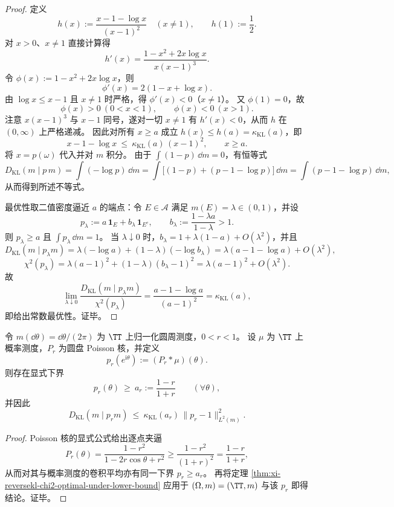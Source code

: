 \begin{proof}
定义
\[
h(x):=\frac{x-1-\log x}{(x-1)^2}\quad(x\neq 1),\qquad h(1):=\frac12.
\]
对 \(x>0\)、\(x\neq 1\) 直接计算得
\[
h'(x)=\frac{1-x^2+2x\log x}{x(x-1)^3}.
\]
令 \(\phi(x):=1-x^2+2x\log x\)，则
\[
\phi'(x)=2(1-x+\log x).
\]
由 \(\log x\le x-1\) 且 \(x\neq 1\) 时严格，得 \(\phi'(x)<0\)（\(x\neq 1\)）。
又 \(\phi(1)=0\)，故
\[
\phi(x)>0\ (0<x<1),\qquad \phi(x)<0\ (x>1).
\]
注意 \(x(x-1)^3\) 与 \(x-1\) 同号，遂对一切 \(x\neq 1\) 有 \(h'(x)<0\)，从而 \(h\) 在 \((0,\infty)\) 上严格递减。
因此对所有 \(x\ge a\) 成立 \(h(x)\le h(a)=\kappa_{\mathrm{KL}}(a)\)，即
\[
x-1-\log x\ \le\ \kappa_{\mathrm{KL}}(a)\,(x-1)^2,\qquad x\ge a.
\]
将 \(x=p(\omega)\) 代入并对 \(m\) 积分。
由于 \(\int (1-p)\,\dd m=0\)，有恒等式
\[
D_{\mathrm{KL}}(m\mid p\,m)
=\int (-\log p)\,\dd m
=\int\bigl[(1-p)+(p-1-\log p)\bigr]\,\dd m
=\int(p-1-\log p)\,\dd m,
\]
从而得到所述不等式。
\par
最优性取二值密度逼近 \(a\) 的端点：令 \(E\in\mathcal A\) 满足 \(m(E)=\lambda\in(0,1)\)，并设
\[
p_\lambda:=a\,\mathbf{1}_E+b_\lambda\,\mathbf{1}_{E^c},
\qquad
b_\lambda:=\frac{1-\lambda a}{1-\lambda}>1.
\]
则 \(p_\lambda\ge a\) 且 \(\int p_\lambda\,\dd m=1\)。
当 \(\lambda\downarrow 0\) 时，\(b_\lambda=1+\lambda(1-a)+O(\lambda^2)\)，并且
\[
D_{\mathrm{KL}}(m\mid p_\lambda m)
=\lambda(-\log a)+(1-\lambda)(-\log b_\lambda)
=\lambda(a-1-\log a)+O(\lambda^2),
\]
\[
\chi^2(p_\lambda)
=\lambda(a-1)^2+(1-\lambda)(b_\lambda-1)^2
=\lambda(a-1)^2+O(\lambda^2).
\]
故
\[
\lim_{\lambda\downarrow 0}\frac{D_{\mathrm{KL}}(m\mid p_\lambda m)}{\chi^2(p_\lambda)}
=\frac{a-1-\log a}{(a-1)^2}
=\kappa_{\mathrm{KL}}(a),
\]
即给出常数最优性。证毕。
\end{proof}

\begin{corollary}\label{cor:xi-poisson-lowerbound-reversekl-l2}
令 \(m(\dd\theta)=\dd\theta/(2\pi)\) 为 \(\TT\) 上归一化圆周测度，\(0<r<1\)。
设 \(\mu\) 为 \(\TT\) 上概率测度，\(P_r\) 为圆盘 Poisson 核，并定义
\[
p_r(e^{\mathrm i\theta}):=(P_r*\mu)(\theta).
\]
则存在显式下界
\[
p_r(\theta)\ \ge\ a_r:=\frac{1-r}{1+r}\qquad(\forall \theta),
\]
并因此
\[
D_{\mathrm{KL}}(m\mid p_r m)\ \le\ \kappa_{\mathrm{KL}}(a_r)\,\|p_r-1\|_{L^2(m)}^2.
\]
\end{corollary}
\begin{proof}
Poisson 核的显式公式给出逐点夹逼
\[
P_r(\theta)=\frac{1-r^2}{1-2r\cos\theta+r^2}
\ge
\frac{1-r^2}{(1+r)^2}
=\frac{1-r}{1+r},
\]
从而对其与概率测度的卷积平均亦有同一下界 \(p_r\ge a_r\)。
再将定理 \ref{thm:xi-reversekl-chi2-optimal-under-lower-bound} 应用于 \((\Omega,m)=(\TT,m)\) 与该 \(p_r\) 即得结论。证毕。
\end{proof}


